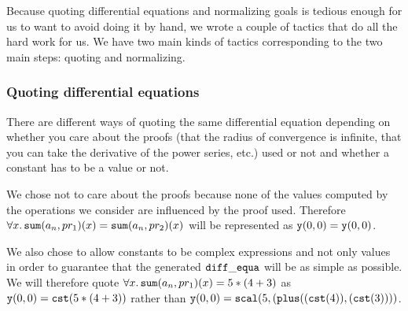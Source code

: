 \documentclass{article}
\begin{document}
Because quoting differential equations and normalizing goals is tedious enough
for us to want to avoid doing it by hand, we wrote a couple of tactics that do
all the hard work for us. We have two main kinds of tactics corresponding to the
two main steps: quoting and normalizing.

\subsubsection{Quoting differential equations}

There are different ways of quoting the same differential equation depending on
whether you care about the proofs (that the radius of convergence is infinite,
that you can take the derivative of the power series, etc.) used or not and
whether a constant has to be a value or not.

We chose not to care about the proofs because none of the values computed by the
operations we consider are influenced by the proof used. Therefore
$\forall x. \operatorname{\mathtt{sum}}(a_n, pr_1)(x) = \operatorname{\mathtt{sum}}(a_n, pr_2)(x)$ will be represented as
$\operatorname{\mathtt{y}}(0,0) = \operatorname{\mathtt{y}}(0,0)$.

We also chose to allow constants to be complex expressions and not only values
in order to guarantee that the generated $\operatorname{\mathtt{diff\_equa}}$ will be as simple as possible.
We will therefore quote $\forall x. \operatorname{\mathtt{sum}}(a_n, pr_1)(x) = 5 * (4 + 3)$ as
$\operatorname{\mathtt{y}}(0,0) = \operatorname{\mathtt{cst}} (5 * (4 + 3))$ rather than $\operatorname{\mathtt{y}}(0,0) = \operatorname{\mathtt{scal}} (5, (\operatorname{\mathtt{plus}} ((\operatorname{\mathtt{cst}}(4)),
(\operatorname{\mathtt{cst}}(3))))$.
\end{document}
